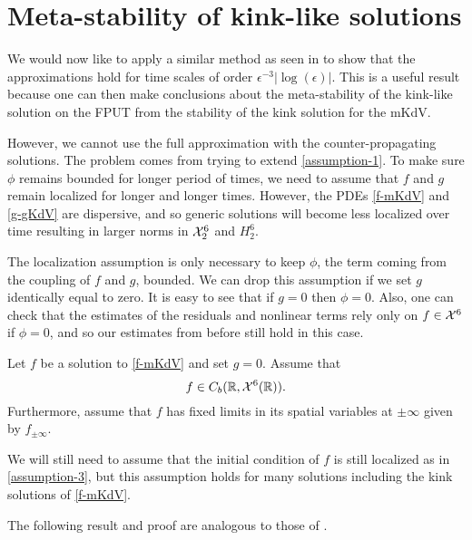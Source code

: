 \section{Meta-stability of kink-like solutions}

We would now like to apply a similar method as seen in \cite{khan2017long} to show that the approximations hold for time scales of order \(\epsilon^{-3}|\log(\epsilon)|\). This is a useful result because one can then make conclusions about the meta-stability of the kink-like solution on the FPUT from the stability of the kink solution for the mKdV. 

However, we cannot use the full approximation with the counter-propagating solutions. The problem comes from trying to extend \cref{assumption-1}. To make sure \(\phi\) remains bounded for longer period of times, we need to assume that \(f\) and \(g\) remain localized for longer and longer times. However, the PDEs \cref{f-mKdV} and \cref{g-gKdV} are dispersive, and so generic solutions will become less localized over time resulting in larger norms in \(\mathcal{X}^6_2\) and \(H^6_2\).

The localization assumption is only necessary to keep \(\phi\), the term coming from the coupling of \(f\) and \(g\), bounded. We can drop this assumption if we set \(g\) identically equal to zero. It is easy to see that if \(g=0\) then \(\phi = 0\). Also, one can check that the estimates of the residuals and nonlinear terms rely only on \(f \in \mathcal{X}^6\) if \(\phi = 0\), and so our estimates from before still hold in this case.

\begin{assum}\label{assumption-4}
	Let \(f\) be a solution to \cref{f-mKdV} and set \(g = 0\). Assume that 
	\begin{equation}
		f \in C_b(\mathbb{R}, \mathcal{X}^6(\mathbb{R})).
	\end{equation}
	Furthermore, assume that \(f\) has fixed limits in its spatial variables at \(\pm \infty\) given by \(f_{\pm \infty}\).
\end{assum}

We will still need to assume that the initial condition of \(f\) is still localized as in \cref{assumption-3}, but this assumption holds for many solutions including the kink solutions of \cref{f-mKdV}.

The following result and proof are analogous to those of \cite[Thm.~1]{khan2017long}.

